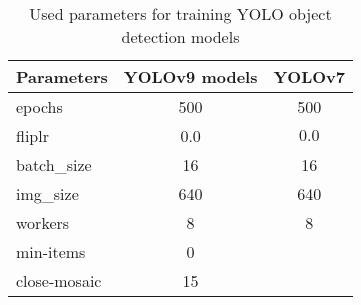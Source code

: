 \begin{table}[H]
    \centering
    \begin{tabular}{|l|c|c|}
        \hline
        \textbf{Parameters} & \textbf{YOLOv9 models} & \textbf{YOLOv7}\\
        \hline
        epochs & 500 & 500\\
        \hline
        fliplr & 0.0 & $0.0$\\
        \hline
        batch\_size& 16 & 16\\
        \hline
        img\_size & 640 & 640\\
        \hline
        workers & 8 & 8\\
        \hline
        min-items & 0 & \\
        \hline
        close-mosaic & 15 & \\
        \hline
    \end{tabular}
    \caption{Used parameters for training \ac{YOLO} object detection models}
    \label{tab:usedParametersYOLOs}
\end{table}